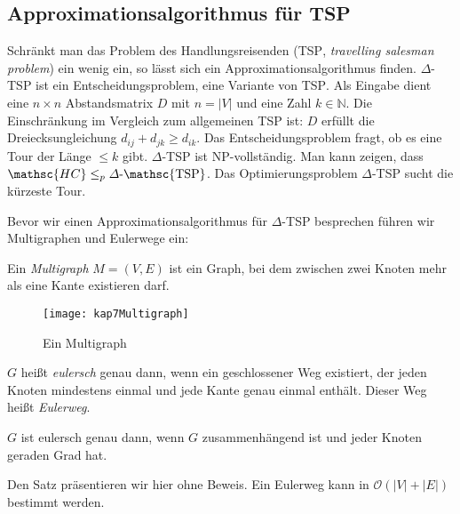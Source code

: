 \subsection{Approximationsalgorithmus für TSP}
Schränkt man das Problem des Handlungsreisenden (\textsc{TSP}, \textit{travelling salesman problem}) ein wenig ein, so lässt sich ein Approximationsalgorithmus finden. \textsc{$\varDelta$-TSP} ist ein Entscheidungsproblem, eine Variante von \textsc{TSP}. Als Eingabe dient eine $n \times n$ Abstandsmatrix $D$ mit $n=|V|$ und eine Zahl $k \in \mathbb{N}$. Die Einschränkung im Vergleich zum allgemeinen TSP ist: $D$ erfüllt die Dreiecksungleichung $d_{ij} + d_{jk} \ge d_{ik}$. Das Entscheidungsproblem fragt, ob es eine Tour der Länge $\le k$ gibt. \textsc{$\varDelta$-TSP} ist \textsf{NP}-vollständig. Man kann zeigen, dass $\mathsc{HC} \le_p \operatorname{\varDelta-\mathsc{TSP}}$. Das Optimierungsproblem \textsc{$\varDelta$-TSP} sucht die kürzeste Tour.

Bevor wir einen Approximationsalgorithmus für \textsc{$\varDelta$-TSP} besprechen führen wir Multigraphen und Eulerwege ein:

\begin{Def}[Multigraph]
  \hspace{\parindent}Ein \textit{Multigraph} $M=(V,E)$ ist ein Graph, bei dem zwischen zwei Knoten mehr als eine Kante existieren darf.
\end{Def}

\begin{figure}[htb]
  \centering
  \texttt{[image: kap7Multigraph]}
  \caption{Ein Multigraph}
  \label{kap7Multigraph}
\end{figure}

\begin{Def}
  \hspace{\parindent}$G$ heißt \textit{eulersch} genau dann, wenn ein geschlossener Weg existiert, der jeden Knoten mindestens einmal und jede Kante genau einmal enthält. Dieser Weg heißt \textit{Eulerweg}.
\end{Def}

\begin{Satz}
  \hspace{\parindent}$G$ ist eulersch genau dann, wenn $G$ zusammenhängend ist und jeder Knoten geraden Grad hat.
\end{Satz}

Den Satz präsentieren wir hier ohne Beweis. Ein Eulerweg kann in $\mathcal{O}(|V| + |E|)$ bestimmt werden.

